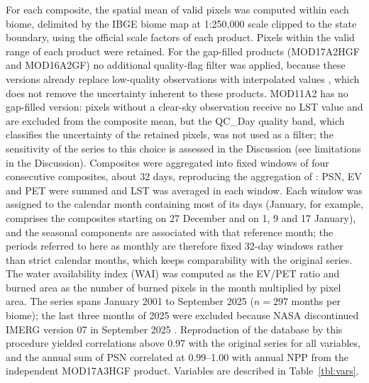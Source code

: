 \documentclass[a4paper,fleqn]{cas-sc}
\begin{document}
For each composite, the spatial mean of valid pixels was computed within each biome, delimited by the IBGE biome map at 1:250,000 scale \citep{ibge2019} clipped to the state boundary, using the official scale factors of each product. Pixels within the valid range of each product were retained. For the gap-filled products (MOD17A2HGF and MOD16A2GF) no additional quality-flag filter was applied, because these versions already replace low-quality observations with interpolated values \citep{running2021gpp}, which does not remove the uncertainty inherent to these products. MOD11A2 has no gap-filled version: pixels without a clear-sky observation receive no LST value and are excluded from the composite mean, but the QC\_Day quality band, which classifies the uncertainty of the retained pixels, was not used as a filter; the sensitivity of the series to this choice is assessed in the Discussion (see limitations in the Discussion). Composites were aggregated into fixed windows of four consecutive composites, about 32 days, reproducing the aggregation of \citet{benfica2022,benfica2023}: PSN, EV and PET were summed and LST was averaged in each window. Each window was assigned to the calendar month containing most of its days (January, for example, comprises the composites starting on 27 December and on 1, 9 and 17 January), and the seasonal components are associated with that reference month; the periods referred to here as monthly are therefore fixed 32-day windows rather than strict calendar months, which keeps comparability with the original series. The water availability index (WAI) was computed as the EV/PET ratio and burned area as the number of burned pixels in the month multiplied by pixel area. The series spans January 2001 to September 2025 ($n = 297$ months per biome); the last three months of 2025 were excluded because NASA discontinued IMERG version 07 in September 2025 \citep{nasa2026}. Reproduction of the \citet{benfica2023} database by this procedure yielded correlations above 0.97 with the original series for all variables, and the annual sum of PSN correlated at 0.99--1.00 with annual NPP from the independent MOD17A3HGF product. Variables are described in Table~\ref{tbl:vars}.
\end{document}
